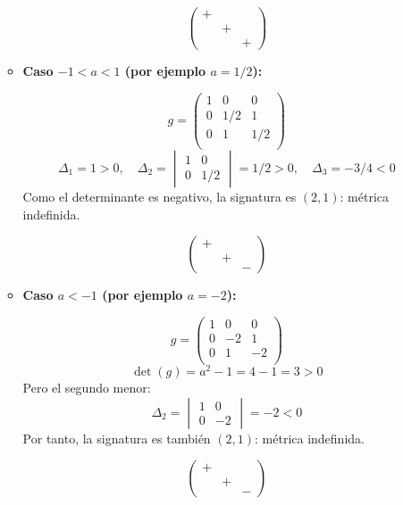 \documentclass[12pt]{article}
\begin{document}
\begin{ejercicio}[4 puntos]
\begin{enumerate}
\begin{itemize}
				\[
				\begin{pmatrix}
					+ &   &   \\
					& + &   \\
					&   & +
				\end{pmatrix}
				\]
				
				\item \textbf{Caso \( -1 < a < 1 \) (por ejemplo \( a = 1/2 \)):}
				
				\[
				g = \begin{pmatrix}
					1 & 0 & 0 \\
					0 & 1/2 & 1 \\
					0 & 1 & 1/2 \\
				\end{pmatrix}
				\]
				\[
				\Delta_1 = 1 > 0, \quad \Delta_2 = \begin{vmatrix} 1 & 0 \\ 0 & 1/2 \end{vmatrix} = 1/2 > 0, \quad
				\Delta_3 = -3/4 < 0
				\]
				Como el determinante es negativo, la signatura es \( (2,1) \): métrica indefinida.
				
				\[
				\begin{pmatrix}
					+ &   &   \\
					& + &   \\
					&   & -
				\end{pmatrix}
				\]
				
				\item \textbf{Caso \( a < -1 \) (por ejemplo \( a = -2 \)):}
				
				\[
				g = \begin{pmatrix}
					1 & 0 & 0 \\
					0 & -2 & 1 \\
					0 & 1 & -2 \\
				\end{pmatrix}
				\]
				\[
				\det(g) = a^2 - 1 = 4 - 1 = 3 > 0
				\]
				Pero el segundo menor:
				\[
				\Delta_2 = \begin{vmatrix} 1 & 0 \\ 0 & -2 \end{vmatrix} = -2 < 0
				\]
				Por tanto, la signatura es también \( (2,1) \): métrica indefinida.
				
				\[
				\begin{pmatrix}
					+ &   &   \\
					& + &   \\
					&   & -
				\end{pmatrix}
				\]
				

\end{itemize}
\end{enumerate}
\end{ejercicio}
\end{document}
